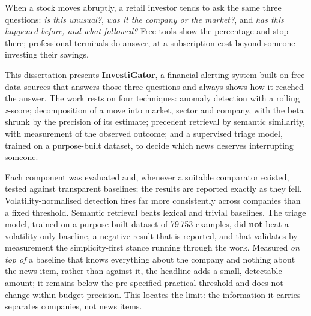 \begin{abstract}
O sistema esteve em funcionamento contínuo durante a escrita desta dissertação, e as suas próprias decisões foram avaliadas uma segunda vez contra o que o mercado fez a seguir, sobre $825$ decisões já maturadas.

O sistema recusa, por desenho, prever preços: explica o que já aconteceu, com a evidência ao lado. A única excepção é declarada como tal e vai no fim de cada alerta: uma probabilidade de o mercado reagir de forma invulgar, \emph{em qualquer direção}, que é uma afirmação sobre a materialidade e nunca sobre o sentido do movimento.
\end{abstract}

\begin{abstractotherlanguage}
When a stock moves abruptly, a retail investor tends to ask the same three questions:
\emph{is this unusual?}, \emph{was it the company or the market?}, and \emph{has this happened
before, and what followed?} Free tools show the percentage and stop there; professional terminals do
answer, at a subscription cost beyond someone investing their savings.

This dissertation presents \textbf{InvestiGator}, a financial alerting system built on free data
sources that answers those three questions and always shows how it reached the answer. The work
rests on four techniques: anomaly detection with a rolling \emph{z}-score; decomposition of a move
into market, sector and company, with the beta shrunk by the precision of its estimate; precedent
retrieval by semantic similarity, with measurement of the observed outcome; and a supervised triage
model, trained on a purpose-built dataset, to decide which news deserves interrupting someone.

Each component was evaluated and, whenever a suitable comparator existed, tested against transparent
baselines; the results are reported exactly as they fell. Volatility-normalised detection fires far more consistently across companies than a fixed
threshold. Semantic retrieval beats lexical and trivial baselines. The triage model, trained on
a purpose-built dataset of 79\,753 examples, did \textbf{not} beat a volatility-only baseline, a negative result that is
reported, and that validates by measurement the simplicity-first stance running through the work. Measured \emph{on top of} a baseline that knows everything about the company and nothing about the news item, rather than against it, the headline adds a small, detectable amount; it remains below the pre-specified practical threshold and does not change within-budget precision. This locates the limit: the information it carries separates companies, not news items.


\end{abstractotherlanguage}
